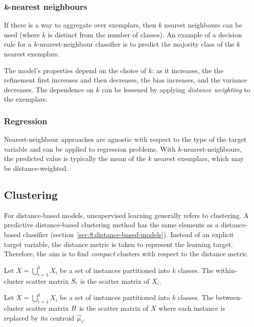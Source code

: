 \subsubsection{\textit{k}-nearest neighbours}

If there is a way to aggregate over exemplars, then $k$ nearest neighbours can
be used (where $k$ is distinct from the number of classes).
An example of a decision rule for a $k$-nearest-neighbour classifier is to
predict the majority class of the $k$ nearest exemplars.

The model's properties depend on the choice of $k$: as it increases, the the
refinement first increases and then decreases, the bias increases, and the
variance decreases.
The dependence on $k$ can be lessened by applying \textit{distance weighting}
to the exemplars.

\subsubsection{Regression}

Nearest-neighbour approaches are agnostic with respect to the type of the
target variable and can be applied to regression problems.
With $k$-nearest-neighbours, the predicted value is typically the mean of the
$k$ nearest exemplars, which may be distance-weighted.

\subsection{Clustering}
\label{sec:8:clustering}

For distance-based models, unsupervised learning generally refers to
clustering.
A predictive distance-based clustering method has the same elements as a
distance-based classifier (section~\ref{sec:8:distance-based-models}).
Instead of an explicit target variable, the distance metric is taken to
represent the learning target.
Therefore, the aim is to find \textit{compact} clusters with respect to the
distance metric.

\begin{dfn}
  Let $X = \bigcup_{i = 1}^{k}
    X_i$ be a set of instances partitioned into $k$ classes.
  The within-cluster scatter matrix $S_i$ is the scatter matrix of $X_i$.
\end{dfn}

\begin{dfn}
  Let $X = \bigcup_{i = 1}^{k}
    X_i$ be a set of instances partitioned into $k$ classes.
  The between-cluster scatter matrix $B$ is the scatter matrix of $X$
  where each instance is replaced by its centroid $\vec{\mu}_i$.
\end{dfn}

